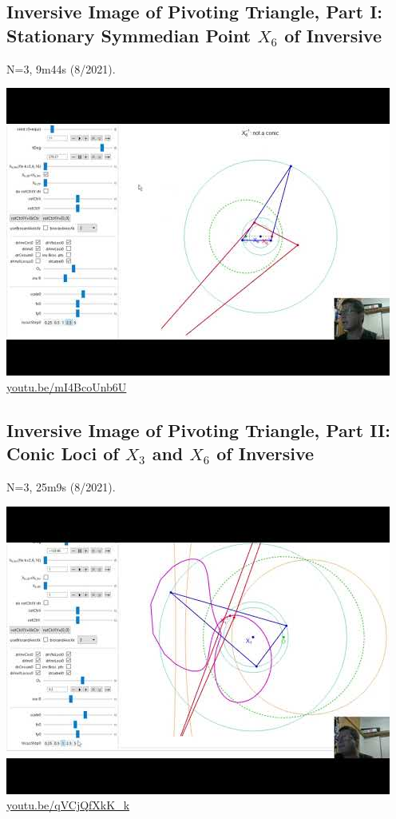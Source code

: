 \documentclass[12pt]{amsart}
\begin{document}
\subsection{Inversive Image of Pivoting Triangle, Part I: Stationary Symmedian Point $X_{6}$ of Inversive}
\label{vid:mI4BcoUnb6U}
\noindent N=3, 9m44s (8/2021). 
\begin{center}\includegraphics[width=.5\textwidth]{pics/mI4BcoUnb6U.jpg} \\ 
\href{https://youtu.be/mI4BcoUnb6U}{\url{youtu.be/mI4BcoUnb6U}}\end{center}
% 
\subsection{Inversive Image of Pivoting Triangle, Part II: Conic Loci of $X_{3}$ and $X_{6}$ of Inversive}
\label{vid:qVCjQfXkK_k}
\noindent N=3, 25m9s (8/2021). 
\begin{center}\includegraphics[width=.5\textwidth]{pics/qVCjQfXkK_k.jpg} \\ 
\href{https://youtu.be/qVCjQfXkK_k}{\url{youtu.be/qVCjQfXkK\_k}}\end{center}
% 
\end{document}
